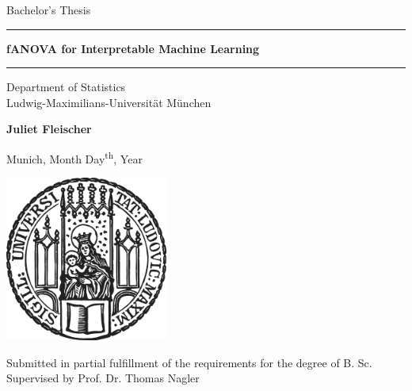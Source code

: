 \documentclass[12pt]{article}
\newcommand{\mytitle}{fANOVA for Interpretable Machine Learning}
\newcommand{\myname}{Juliet Fleischer}
\newcommand{\mysupervisor}{Prof. Dr. Thomas Nagler}
\begin{document}
 
\begin{titlepage}
\begin{center}
    
\LARGE
Bachelor's Thesis
    
\vspace{0.5cm}
      
\rule{\textwidth}{1.5pt}
\LARGE
\textbf{\mytitle}
\rule{\textwidth}{1.5pt}
   
\vspace{0.5cm}
      
\large
Department of Statistics \\
Ludwig-Maximilians-Universität München 

\vfill

\Large
\textbf{\myname}

\vfill

\large
Munich, Month Day\textsuperscript{th}, Year
      
\vfill

\includegraphics[width = 0.4\textwidth]{sigillum.png}

\vfill

\normalsize
Submitted in partial fulfillment of the requirements for the degree of B. Sc.
\\

Supervised by \mysupervisor

\end{center}
\end{titlepage}


\newpage

\begin{abstract}

fANOVA decomposition
functional decomposition method
Hoeffding decomposition related
rediscovered in the IML community
in this BA we revisit method; clean formal definition into classical and generalized; unify across notations and also conceptual differences; test existing estimation methods from two packages and compare results to theoretical solution, discover parallel to Hoeffding decomposition.
\end{abstract}
\end{document}
